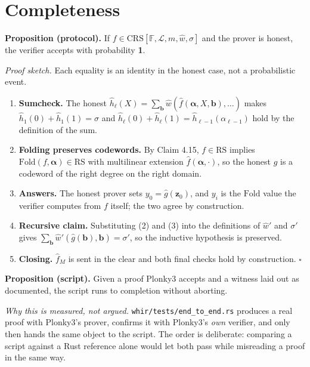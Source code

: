 \documentclass[11pt,a4paper]{article}
\newcommand{\Fold}{\mathrm{Fold}}
\newcommand{\RS}{\mathrm{RS}}
\newcommand{\CRS}{\mathrm{CRS}}
\begin{document}
\section{Completeness}

\textbf{Proposition (protocol).} If $f\in\CRS[\mathbb{F},\mathcal{L},m,\hat w,\sigma]$ and the prover
is honest, the verifier accepts with probability \textbf{1}.

\emph{Proof sketch.} Each equality is an identity in the honest case, not a probabilistic event.

\begin{enumerate}
  \item \textbf{Sumcheck.} The honest $\hat h_{\ell}(X)=\sum_{\boldsymbol b}
  \hat w(\hat f(\boldsymbol\alpha,X,\boldsymbol b),\dots)$ makes
  $\hat h_{1}(0)+\hat h_{1}(1)=\sigma$ and
  $\hat h_{\ell}(0)+\hat h_{\ell}(1)=\hat h_{\ell-1}(\alpha_{\ell-1})$ hold by the definition of the
  sum.
  \item \textbf{Folding preserves codewords.} By Claim 4.15, $f\in\RS$ implies
  $\Fold(f,\boldsymbol\alpha)\in\RS$ with multilinear extension $\hat f(\boldsymbol\alpha,\cdot)$, so
  the honest $g$ is a codeword of the right degree on the right domain.
  \item \textbf{Answers.} The honest prover sets $y_{0}=\hat g(\boldsymbol z_{0})$, and $y_{i}$ is
  the $\Fold$ value the verifier computes from $f$ itself; the two agree by construction.
  \item \textbf{Recursive claim.} Substituting (2) and (3) into the definitions of $\hat w'$ and
  $\sigma'$ gives $\sum_{\boldsymbol b}\hat w'(\hat g(\boldsymbol b),\boldsymbol b)=\sigma'$, so the
  inductive hypothesis is preserved.
  \item \textbf{Closing.} $\hat f_{M}$ is sent in the clear and both final checks hold by
  construction. \hfill$\square$
\end{enumerate}

\textbf{Proposition (script).} Given a proof Plonky3 accepts and a witness laid out as documented,
the script runs to completion without aborting.

\emph{Why this is measured, not argued.} \texttt{whir/tests/end\_to\_end.rs} produces a real proof
with Plonky3's prover, confirms it with Plonky3's \emph{own} verifier, and only then hands the same
object to the script. The order is deliberate: comparing a script against a Rust reference alone
would let both pass while misreading a proof in the same way.
\end{document}
